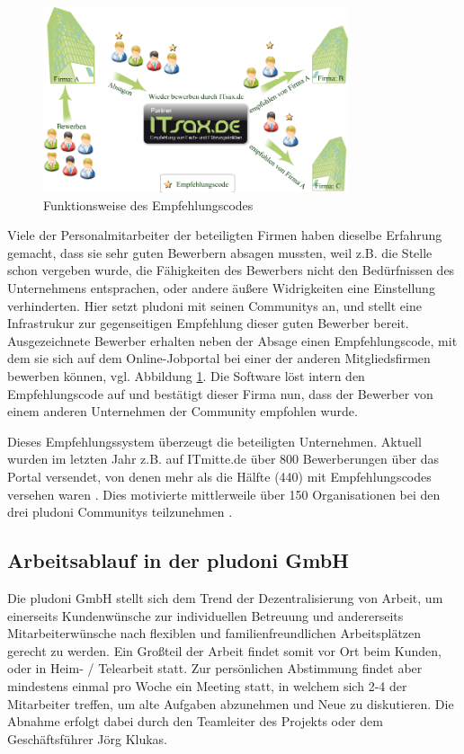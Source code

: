 \begin{figure}[htbp]
 \centering
 \includegraphics[width=0.8\textwidth]{./material/empfehlungscode.png}
 \caption{Funktionsweise des Empfehlungscodes}
 \label{fig:empfehlung}
\end{figure}
Viele der Personalmitarbeiter der beteiligten Firmen haben dieselbe Erfahrung gemacht, dass sie sehr guten Bewerbern absagen mussten, weil z.B. die Stelle schon vergeben wurde, die Fähigkeiten des Bewerbers nicht den Bedürfnissen des Unternehmens entsprachen, oder andere äußere Widrigkeiten eine Einstellung verhinderten. Hier setzt pludoni mit seinen Communitys an, und stellt eine Infrastrukur zur gegenseitigen Empfehlung dieser guten Bewerber bereit.  Ausgezeichnete Bewerber erhalten neben der Absage einen Empfehlungscode, mit dem sie sich auf dem Online-Jobportal bei einer der anderen Mitgliedsfirmen bewerben können, vgl. Abbildung \ref{fig:empfehlung}. Die Software löst intern den Empfehlungscode auf und bestätigt dieser Firma nun, dass der Bewerber von einem anderen Unternehmen der Community empfohlen wurde.

Dieses Empfehlungssystem überzeugt die beteiligten Unternehmen. Aktuell wurden im letzten Jahr z.B. auf ITmitte.de über 800 Bewerberungen über das Portal versendet, von denen mehr als die Hälfte (440) mit Empfehlungscodes versehen waren \citep{joerg_klukas_startseite_2011}. Dies motivierte mittlerweile über 150 Organisationen bei den drei pludoni Communitys teilzunehmen \citep{joerg_klukas_referenzen_2011}.

\subsection{Arbeitsablauf in der pludoni GmbH}
\label{sec:arbeitsablauf}
Die pludoni GmbH stellt sich dem Trend der Dezentralisierung von Arbeit, um einerseits Kundenwünsche zur individuellen Betreuung und andererseits Mitarbeiterwünsche nach flexiblen und familienfreundlichen Arbeitsplätzen gerecht zu werden. Ein Großteil der Arbeit findet somit vor Ort beim Kunden, oder in Heim- / Telearbeit statt.
Zur persönlichen Abstimmung findet aber mindestens einmal pro Woche ein Meeting statt, in welchem sich 2-4 der Mitarbeiter treffen, um alte Aufgaben abzunehmen und Neue zu diskutieren. Die Abnahme erfolgt dabei durch den Teamleiter des Projekts oder dem Geschäftsführer Jörg Klukas.

